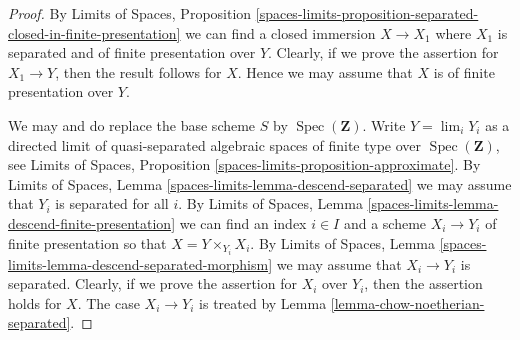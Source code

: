 \documentclass[10pt,a4paper]{amsart}
\theoremstyle{plain}
\theoremstyle{definition}
\theoremstyle{remark}
\numberwithin{equation}{subsection}
\def\lim{\mathop{\mathrm{lim}}\nolimits}
\def\Spec{\mathop{\mathrm{Spec}}}
\begin{document}
\begin{proof}
By
Limits of Spaces, Proposition
\ref{spaces-limits-proposition-separated-closed-in-finite-presentation}
we can find a closed immersion $X \to X_1$ where $X_1$ is separated
and of finite presentation over $Y$. Clearly, if we prove the assertion
for $X_1 \to Y$, then the result follows for $X$. Hence we may assume that
$X$ is of finite presentation over $Y$.

\medskip\noindent
We may and do replace the base scheme $S$ by $\Spec(\mathbf{Z})$.
Write $Y = \lim_i Y_i$ as a directed limit of
quasi-separated algebraic spaces of finite type over $\Spec(\mathbf{Z})$, see
Limits of Spaces,
Proposition \ref{spaces-limits-proposition-approximate}.
By Limits of Spaces, Lemma \ref{spaces-limits-lemma-descend-separated}
we may assume that $Y_i$ is separated for all $i$.
By
Limits of Spaces,
Lemma \ref{spaces-limits-lemma-descend-finite-presentation}
we can
find an index $i \in I$ and a scheme $X_i \to Y_i$ of finite presentation
so that $X = Y \times_{Y_i} X_i$.
By
Limits of Spaces,
Lemma \ref{spaces-limits-lemma-descend-separated-morphism}
we may assume that $X_i \to Y_i$ is separated.
Clearly, if we prove the assertion for
$X_i$ over $Y_i$, then the assertion holds for $X$. The case
$X_i \to Y_i$ is treated by
Lemma \ref{lemma-chow-noetherian-separated}.
\end{proof}
\end{document}

